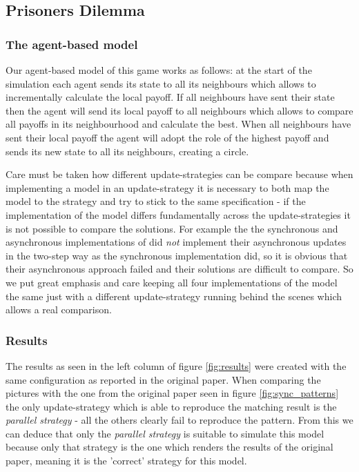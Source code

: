 \subsection{Prisoners Dilemma}
\subsubsection{The agent-based model}
Our agent-based model of this game works as follows: at the start of the simulation each agent sends its state to all its neighbours which allows to incrementally calculate the local payoff. If all neighbours have sent their state then the agent will send its local payoff to all neighbours which allows to compare all payoffs in its neighbourhood and calculate the best. When all neighbours have sent their local payoff the agent will adopt the role of the highest payoff and sends its new state to all its neighbours, creating a circle. 

Care must be taken how different update-strategies can be compare because when implementing a model in an update-strategy it is necessary to both map the model to the strategy and try to stick to the same specification - if the implementation of the model differs fundamentally across the update-strategies it is not possible to compare the solutions. For example the the synchronous and asynchronous implementations of \cite{huberman_evolutionary_1993} did \textit{not} implement their asynchronous updates in the two-step way as the synchronous implementation did, so it is obvious that their asynchronous approach failed and their solutions are difficult to compare. So we put great emphasis and care keeping all four implementations of the model the same just with a different update-strategy running behind the scenes which allows a real comparison.

\subsubsection{Results}
The results as seen in the left column of figure \ref{fig:results} were created with the same configuration as reported in the original paper. When comparing the pictures with the one from the original paper seen in figure \ref{fig:sync_patterns} the only update-strategy which is able to reproduce the matching result is the \textit{parallel strategy} - all the others clearly fail to reproduce the pattern. From this we can deduce that only the \textit{parallel strategy} is suitable to simulate this model because only that strategy is the one which renders the results of the original paper, meaning it is the 'correct' strategy for this model. 

